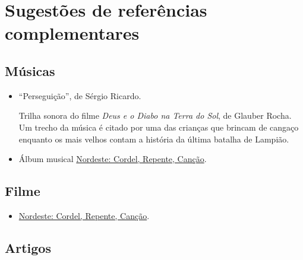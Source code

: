 \documentclass[11pt]{extarticle}
\begin{document}



\section{Sugestões de referências complementares}

\subsection{Músicas} 

\begin{itemize}
	\item ``Perseguição'', de Sérgio Ricardo. 

Trilha sonora do filme \textit{Deus e o Diabo na Terra do Sol}, de Glauber Rocha. 
Um trecho da música é citado por uma das crianças que brincam de cangaço enquanto os mais velhos contam a história
da última batalha de Lampião.

	\item Álbum musical \href{https://www.youtube.com/watch?v=wS6jzcZcc6U}{Nordeste: Cordel, Repente, Canção}. 
\end{itemize}

\subsection{Filme} 
\begin{itemize}

\item \href{https://www.youtube.com/watch?v=xFOZxwBcUmo}{Nordeste: Cordel, Repente, Canção}.

\end{itemize}

\subsection{Artigos}
\end{document}
